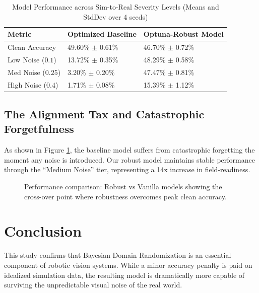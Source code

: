 \documentclass[11pt,a4paper]{article}
\begin{document}
\begin{table}[H]
\centering
\caption{Model Performance across Sim-to-Real Severity Levels (Means and StdDev over 4 seeds)}
\label{tab:comparison}
\begin{tabular}{@{}lll@{}}
\toprule
\textbf{Metric} & \textbf{Optimized Baseline} & \textbf{Optuna-Robust Model} \\ \midrule
Clean Accuracy & 49.60\% $\pm$ 0.61\% & 46.70\% $\pm$ 0.72\% \\
Low Noise ($0.1$) & 13.72\% $\pm$ 0.35\% & 48.29\% $\pm$ 0.58\% \\
Med Noise ($0.25$) & 3.20\% $\pm$ 0.20\% & 47.47\% $\pm$ 0.81\% \\
High Noise ($0.4$) & 1.71\% $\pm$ 0.08\% & 15.39\% $\pm$ 1.12\% \\ \bottomrule
\end{tabular}
\end{table}

\subsection{The Alignment Tax and Catastrophic Forgetfulness}
As shown in Figure \ref{fig:dropoff}, the baseline model suffers from catastrophic forgetting the moment any noise is introduced. Our robust model maintains stable performance through the ``Medium Noise'' tier, representing a 14x increase in field-readiness.

\begin{figure}[H]
    \centering
    \caption{Performance comparison: Robust vs Vanilla models showing the cross-over point where robustness overcomes peak clean accuracy.}
    \label{fig:dropoff}
\end{figure}

\section{Conclusion}
This study confirms that Bayesian Domain Randomization is an essential component of robotic vision systems. While a minor accuracy penalty is paid on idealized simulation data, the resulting model is dramatically more capable of surviving the unpredictable visual noise of the real world.



\end{document}
